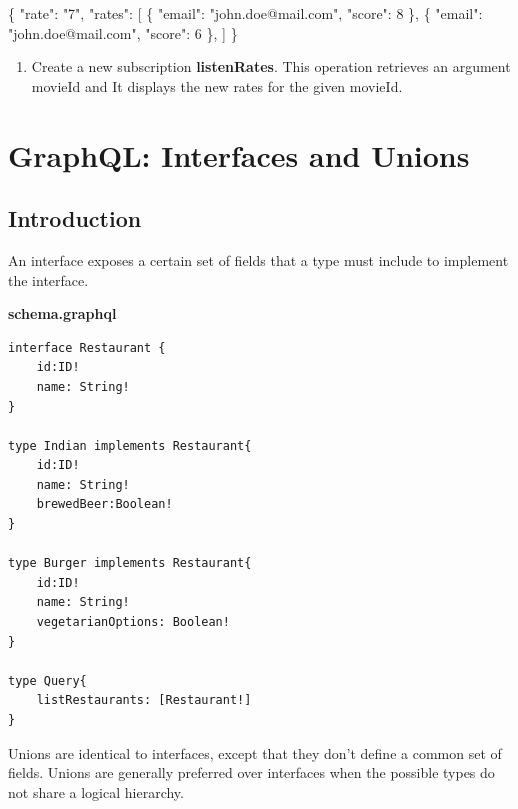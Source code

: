 \documentclass[]{book}
\newenvironment{Shaded}{\begin{snugshade}}{\end{snugshade}}
\newcommand{\DataTypeTok}[1]{\textcolor[rgb]{0.13,0.29,0.53}{#1}}
\newcommand{\DecValTok}[1]{\textcolor[rgb]{0.00,0.00,0.81}{#1}}
\newcommand{\StringTok}[1]{\textcolor[rgb]{0.31,0.60,0.02}{#1}}
\newcommand{\OtherTok}[1]{\textcolor[rgb]{0.56,0.35,0.01}{#1}}
\newcommand{\FunctionTok}[1]{\textcolor[rgb]{0.00,0.00,0.00}{#1}}
\providecommand{\tightlist}{%
  \setlength{\itemsep}{0pt}\setlength{\parskip}{0pt}}
\begin{document}
\begin{Shaded}
\begin{Highlighting}[]
\FunctionTok{\{}
  \DataTypeTok{"rate"}\FunctionTok{:} \StringTok{"7"}\FunctionTok{,}
  \DataTypeTok{"rates"}\FunctionTok{:} \OtherTok{[}
    \FunctionTok{\{}
      \DataTypeTok{"email"}\FunctionTok{:} \StringTok{"john.doe@mail.com"}\FunctionTok{,}
      \DataTypeTok{"score"}\FunctionTok{:} \DecValTok{8}
    \FunctionTok{\}}\OtherTok{,}
    \FunctionTok{\{}
      \DataTypeTok{"email"}\FunctionTok{:} \StringTok{"john.doe@mail.com"}\FunctionTok{,}
      \DataTypeTok{"score"}\FunctionTok{:} \DecValTok{6}
    \FunctionTok{\}}\OtherTok{,}
  \OtherTok{]}
\FunctionTok{\}}
\end{Highlighting}
\end{Shaded}

\begin{enumerate}
\def\labelenumi{\arabic{enumi}.}
\setcounter{enumi}{4}
\tightlist
\item
  Create a new subscription \textbf{listenRates}. This operation
  retrieves an argument movieId and It displays the new rates for the
  given movieId.
\end{enumerate}

\chapter{GraphQL: Interfaces and
Unions}\label{graphql-interfaces-and-unions}

\section{Introduction}\label{introduction-3}

An interface exposes a certain set of fields that a type must include to
implement the interface.

\textbf{schema.graphql}

\begin{verbatim}
interface Restaurant {
    id:ID!
    name: String!
}

type Indian implements Restaurant{
    id:ID!
    name: String!
    brewedBeer:Boolean!
}

type Burger implements Restaurant{
    id:ID!
    name: String!
    vegetarianOptions: Boolean!
}

type Query{
    listRestaurants: [Restaurant!]
}
\end{verbatim}

Unions are identical to interfaces, except that they don't define a
common set of fields. Unions are generally preferred over interfaces
when the possible types do not share a logical hierarchy.
\end{document}
